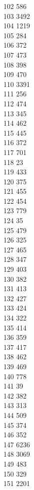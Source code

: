 { 102	586 \\
 103	3492 \\
 104	1219 \\
 105	284 \\
 106	372 \\
 107	473 \\
 108	398 \\
 109	470 \\
 110	3391 \\
 111	256 \\
 112	474 \\
 113	345 \\
 114	462 \\
 115	445 \\
 116	372 \\
 117	701 \\
 118	23 \\
 119	433 \\
 120	375 \\
 121	455 \\
 122	454 \\
 123	779 \\
 124	35 \\
 125	479 \\
 126	325 \\
 127	465 \\
 128	347 \\
 129	403 \\
 130	382 \\
 131	413 \\
 132	427 \\
 133	424 \\
 134	322 \\
 135	414 \\
 136	359 \\
 137	417 \\
 138	462 \\
 139	469 \\
 140	778 \\
 141	39 \\
 142	382 \\
 143	313 \\
 144	509 \\
 145	374 \\
 146	352 \\
 147	6236 \\
 148	3069 \\
 149	483 \\
 150	329 \\
 151	2201 \\
}
